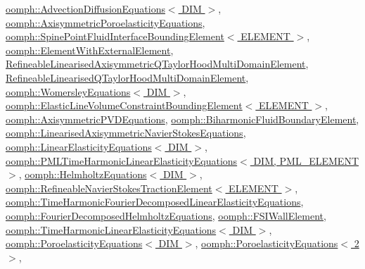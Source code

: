 \hyperlink{classoomph_1_1AdvectionDiffusionEquations_a6ec1e0f92fa79998be9340ecfda4bcd5}{oomph\+::\+Advection\+Diffusion\+Equations$<$ D\+I\+M $>$}, \hyperlink{classoomph_1_1AxisymmetricPoroelasticityEquations_ae9ce19fe1b4cb1556408b4e2d3efaf76}{oomph\+::\+Axisymmetric\+Poroelasticity\+Equations}, \hyperlink{classoomph_1_1SpinePointFluidInterfaceBoundingElement_afe714a2a2b9f741558376cc144e19232}{oomph\+::\+Spine\+Point\+Fluid\+Interface\+Bounding\+Element$<$ E\+L\+E\+M\+E\+N\+T $>$}, \hyperlink{classoomph_1_1ElementWithExternalElement_ae5fb09552a8271e891438f8d058ca1b8}{oomph\+::\+Element\+With\+External\+Element}, \hyperlink{classRefineableLinearisedAxisymmetricQTaylorHoodMultiDomainElement_a057d824e17f4e7ed12b496629dfe67fd}{Refineable\+Linearised\+Axisymmetric\+Q\+Taylor\+Hood\+Multi\+Domain\+Element}, \hyperlink{classRefineableLinearisedQTaylorHoodMultiDomainElement_ae9582bd850c53a41150ffd4c67dd0f00}{Refineable\+Linearised\+Q\+Taylor\+Hood\+Multi\+Domain\+Element}, \hyperlink{classoomph_1_1WomersleyEquations_a4a0779392d756b1450d17879d0c10027}{oomph\+::\+Womersley\+Equations$<$ D\+I\+M $>$}, \hyperlink{classoomph_1_1ElasticLineVolumeConstraintBoundingElement_a6b9670b4a995765e0b2793a3cab05966}{oomph\+::\+Elastic\+Line\+Volume\+Constraint\+Bounding\+Element$<$ E\+L\+E\+M\+E\+N\+T $>$}, \hyperlink{classoomph_1_1AxisymmetricPVDEquations_a80e76c7d645e8863f2dd5b1bf456516a}{oomph\+::\+Axisymmetric\+P\+V\+D\+Equations}, \hyperlink{classoomph_1_1BiharmonicFluidBoundaryElement_a9bc299d6f1c70851999b9e9b72c88602}{oomph\+::\+Biharmonic\+Fluid\+Boundary\+Element}, \hyperlink{classoomph_1_1LinearisedAxisymmetricNavierStokesEquations_a65b02ed2b17993f07d26f3da3a176207}{oomph\+::\+Linearised\+Axisymmetric\+Navier\+Stokes\+Equations}, \hyperlink{classoomph_1_1LinearElasticityEquations_ad09269e02262abfaae2176048066365b}{oomph\+::\+Linear\+Elasticity\+Equations$<$ D\+I\+M $>$}, \hyperlink{classoomph_1_1PMLTimeHarmonicLinearElasticityEquations_af058d2d4b1c5aa77f99a1609fbe69167}{oomph\+::\+P\+M\+L\+Time\+Harmonic\+Linear\+Elasticity\+Equations$<$ D\+I\+M, P\+M\+L\+\_\+\+E\+L\+E\+M\+E\+N\+T $>$}, \hyperlink{classoomph_1_1HelmholtzEquations_ad9a09d4ac9e2321e7655cbe86a4d6d60}{oomph\+::\+Helmholtz\+Equations$<$ D\+I\+M $>$}, \hyperlink{classoomph_1_1RefineableNavierStokesTractionElement_a67eea13f9a419e35576b6183f0438bab}{oomph\+::\+Refineable\+Navier\+Stokes\+Traction\+Element$<$ E\+L\+E\+M\+E\+N\+T $>$}, \hyperlink{classoomph_1_1TimeHarmonicFourierDecomposedLinearElasticityEquations_ae5924f4e2937f652da983c47ea8f08d0}{oomph\+::\+Time\+Harmonic\+Fourier\+Decomposed\+Linear\+Elasticity\+Equations}, \hyperlink{classoomph_1_1FourierDecomposedHelmholtzEquations_a75285db2b555ba4ad1f79ed9bb3bcf03}{oomph\+::\+Fourier\+Decomposed\+Helmholtz\+Equations}, \hyperlink{classoomph_1_1FSIWallElement_a7817d2662c24540d3757cb1a1194a635}{oomph\+::\+F\+S\+I\+Wall\+Element}, \hyperlink{classoomph_1_1TimeHarmonicLinearElasticityEquations_a546ed8d0a485289fa94c0835be57a771}{oomph\+::\+Time\+Harmonic\+Linear\+Elasticity\+Equations$<$ D\+I\+M $>$}, \hyperlink{classoomph_1_1PoroelasticityEquations_a80054aa3b3eb9310430b2c50d45acdda}{oomph\+::\+Poroelasticity\+Equations$<$ D\+I\+M $>$}, \hyperlink{classoomph_1_1PoroelasticityEquations_a80054aa3b3eb9310430b2c50d45acdda}{oomph\+::\+Poroelasticity\+Equations$<$ 2 $>$}, 